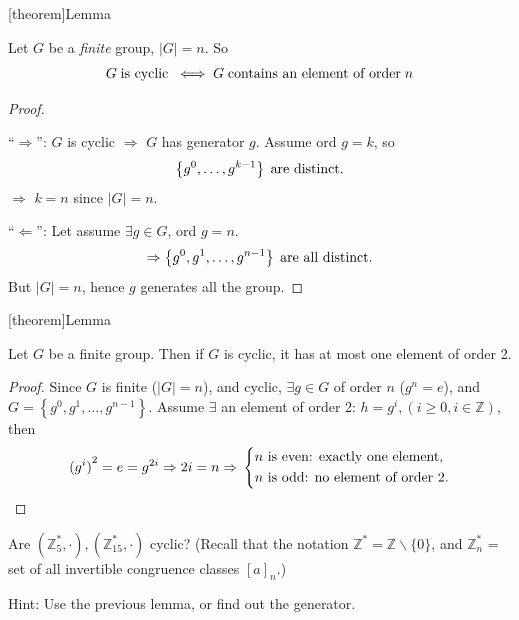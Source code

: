 \documentclass[12pt]{report}
\theoremstyle{definition}
\begin{document}
[theorem]{Lemma}
\begin{G has element of order n}
    Let $G$ be a \emph{finite} group, $|G| = n$. So \[
        G \;\textnormal{is cyclic}\; \iff G \;\textnormal{contains an element of order}\; n
    \]
\end{G has element of order n}

\begin{proof}
    \,

    ``$\Rightarrow$'': $G$ is cyclic $\Rightarrow$ $G$ has generator $g$.
    Assume ord $g = k$, so\[
        \left\{g^0, \ldots, g^{k-1}\right\} \;\textnormal{are distinct}.
    \]
    $\Rightarrow$ $k = n$ since $|G| = n$.
    
    ``$\Leftarrow$'': Let assume $\exists g \in G$, ord $g = n$.
   \[
       \Rightarrow \left\{g^{0}, g^{1}, \ldots, g^{n - 1}\right\} \;\textnormal{are all distinct.}
   \]
   But $|G| = n$, hence $g$ generates all the group.
\end{proof}

[theorem]{Lemma}
\begin{order 2 of element of cyclic group}
    Let $G$ be a finite group. Then if $G$ is cyclic, it has at most one element of order 2.
\end{order 2 of element of cyclic group}

\begin{proof}
    Since $G$ is finite ($|G| = n$), and cyclic, $\exists g \in{}G$ of order $n$ ($g^{n} = e$),
    and $G = \left\{g^{0}, g^{1}, \ldots, g^{n-1}\right\} $.
    Assume $\exists$ an element of order 2: $h = g^{i}, (i \ge{}0, i \in{}\mathbb{Z})$, then\[
        {(g^{i})}^{2} = e = g^{2i} \Rightarrow{}2i = n \Rightarrow{}
        \left\{\begin{align*}
            & \textnormal{$n$ is even: exactly one element,} \\
            & \textnormal{$n$ is odd: no element of order 2.}
        \end{align*}\right.
    \]
\end{proof}

\begin{ex}
    Are $(\mathbb{Z}^{*}_5, \cdot), (\mathbb{Z}^{*}_{15}, \cdot)$ cyclic?
    (Recall that the notation $\mathbb{Z}^{*} = \mathbb{Z} \backslash\{0\}$,
    and $\mathbb{Z}_n^{*}$ = set of all invertible congruence classes ${[a]}_{n}$.)

    Hint: Use the previous lemma, or find out the generator.
\end{ex}
\end{document}
